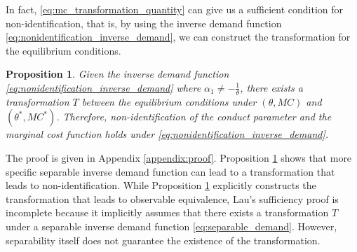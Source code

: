 \documentclass[11pt, a4paper]{article}
\newtheorem{proposition}{Proposition}
\theoremstyle{remark}
\begin{document}
In fact, \eqref{eq:mc_transformation_quantity} can give us a sufficient condition for non-identification, that is, by using the inverse demand function \eqref{eq:nonidentification_inverse_demand}, we can construct the transformation for the equilibrium conditions.
\begin{proposition}\label{proposition:sufficient_nonidentification}
    Given the inverse demand function \eqref{eq:nonidentification_inverse_demand} where $\alpha_1 \ne -\frac{1}{\theta}$, there exists a transformation $T$ between the equilibrium conditions under $(\theta, MC)$ and $(\theta^{*}, MC^{*})$.
    Therefore, non-identification of the conduct parameter and the marginal cost function holds under \eqref{eq:nonidentification_inverse_demand}.
\end{proposition}
The proof is given in Appendix \ref{appendix:proof}.
Proposition \ref{proposition:sufficient_nonidentification} shows that more specific separable inverse demand function can lead to a transformation that leads to non-identification.
While Proposition \ref{proposition:sufficient_nonidentification} explicitly constructs the transformation that leads to observable equivalence,  Lau's sufficiency proof is incomplete because it implicitly assumes that there exists a transformation $T$ under a separable inverse demand function \eqref{eq:separable_demand}.
However, separability itself does not guarantee the existence of the transformation.
\end{document}
